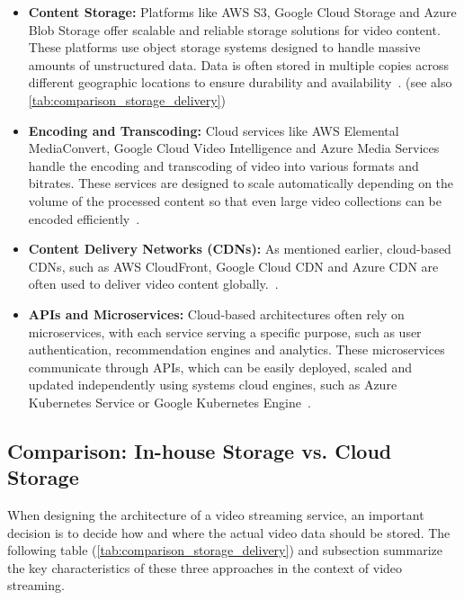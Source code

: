 \begin{itemize}
    \item \textbf{Content Storage:} Platforms like \ac{AWS} S3, Google Cloud Storage and Azure Blob Storage offer scalable and reliable storage solutions for video content. These platforms use object storage systems designed to handle massive amounts of unstructured data. Data is often stored in multiple copies across different geographic locations to ensure durability and availability~\parencite{cloud_streaming}. (see also \autoref{tab:comparison_storage_delivery})
    
    \item \textbf{Encoding and Transcoding:} Cloud services like \ac{AWS} Elemental MediaConvert, Google Cloud Video Intelligence and Azure Media Services handle the encoding and transcoding of video into various formats and bitrates. These services are designed to scale automatically depending on the volume of the processed content so that even large video collections can be encoded efficiently~\parencite{cloud_streaming}.
    
    \item \textbf{Content Delivery Networks (CDNs):} As mentioned earlier, cloud-based \ac{CDN}s, such as \ac{AWS} CloudFront, Google Cloud CDN and Azure CDN are often used to deliver video content globally.~\parencite{cloud_streaming}.
    
    \item \textbf{\ac{API}s and Microservices:} Cloud-based architectures often rely on microservices, with each service serving a specific purpose, such as user authentication, recommendation engines and analytics. These microservices communicate through \ac{API}s, which can be easily deployed, scaled and updated independently using systems cloud engines, such as Azure Kubernetes Service or Google Kubernetes Engine~\parencite{cloud_streaming}.
\end{itemize}

\subsection{Comparison: In-house Storage vs. Cloud Storage}

When designing the architecture of a video streaming service, an important decision is to decide how and where the actual video data should be stored. The following table (\autoref{tab:comparison_storage_delivery}) and subsection summarize the key characteristics of these three approaches in the context of video streaming. 

